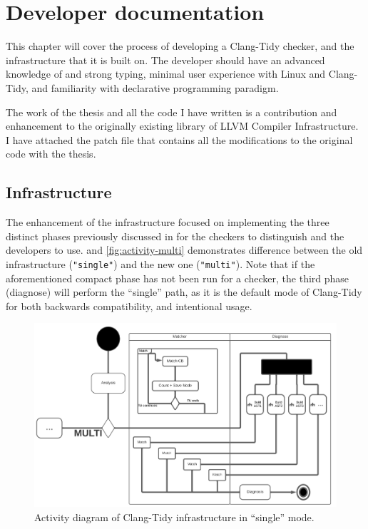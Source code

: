 
\chapter{Developer documentation}
\label{ch:impl}

This chapter will cover the process of developing a Clang-Tidy checker, and the infrastructure that it is built on.
The developer should have an advanced knowledge of \CC{} and strong typing, minimal user experience with Linux and
Clang-Tidy, and familiarity with declarative programming paradigm.

The work of the thesis and all the code I have written is a contribution and enhancement to the originally existing library
of LLVM Compiler Infrastructure. I have attached the patch file that contains all the modifications to the original code
with the thesis.

\section{Infrastructure}
\label{sec:dev-infra}

The enhancement of the infrastructure focused on implementing the three distinct phases previously discussed in 
for the checkers to distinguish and the developers to use.
 and \cref{fig:activity-multi} demonstrates difference between the old infrastructure
(\texttt{"single"}) and the new one (\texttt{"multi"}).
Note that if the aforementioned compact phase has not been run for a checker, the third phase (diagnose) will perform the ``single''
path, as it is the default mode of Clang-Tidy for both backwards compatibility, and intentional usage.

\begin{figure}[H]
	\includegraphics[width=\linewidth]{images/activity_single.png}
	\caption{Activity diagram of Clang-Tidy infrastructure in ``single'' mode.}
	\label{fig:activity-single}
\end{figure}

